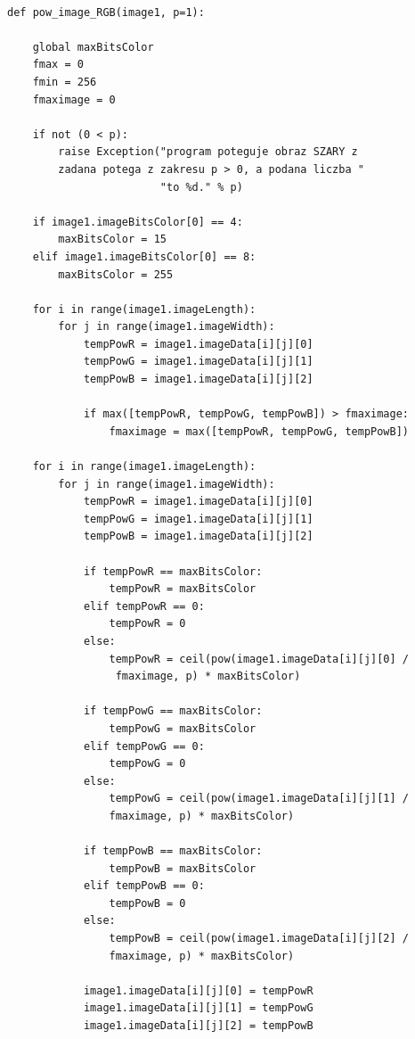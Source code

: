 \documentclass[magisterska,openany]{pracadypl}
\begin{document}
\lstset{language=Python}
\vspace{0.25cm}
\begin{lstlisting}[caption={Potęgowanie obrazu}]

def pow_image_RGB(image1, p=1):

    global maxBitsColor
    fmax = 0
    fmin = 256
    fmaximage = 0

    if not (0 < p):
        raise Exception("program poteguje obraz SZARY z 
        zadana potega z zakresu p > 0, a podana liczba "
                        "to %d." % p)

    if image1.imageBitsColor[0] == 4:
        maxBitsColor = 15
    elif image1.imageBitsColor[0] == 8:
        maxBitsColor = 255

    for i in range(image1.imageLength):
        for j in range(image1.imageWidth):
            tempPowR = image1.imageData[i][j][0]
            tempPowG = image1.imageData[i][j][1]
            tempPowB = image1.imageData[i][j][2]

            if max([tempPowR, tempPowG, tempPowB]) > fmaximage:
                fmaximage = max([tempPowR, tempPowG, tempPowB])

    for i in range(image1.imageLength):
        for j in range(image1.imageWidth):
            tempPowR = image1.imageData[i][j][0]
            tempPowG = image1.imageData[i][j][1]
            tempPowB = image1.imageData[i][j][2]

            if tempPowR == maxBitsColor:
                tempPowR = maxBitsColor
            elif tempPowR == 0:
                tempPowR = 0
            else:
                tempPowR = ceil(pow(image1.imageData[i][j][0] /
                 fmaximage, p) * maxBitsColor)

            if tempPowG == maxBitsColor:
                tempPowG = maxBitsColor
            elif tempPowG == 0:
                tempPowG = 0
            else:
                tempPowG = ceil(pow(image1.imageData[i][j][1] / 
                fmaximage, p) * maxBitsColor)

            if tempPowB == maxBitsColor:
                tempPowB = maxBitsColor
            elif tempPowB == 0:
                tempPowB = 0
            else:
                tempPowB = ceil(pow(image1.imageData[i][j][2] / 
                fmaximage, p) * maxBitsColor)

            image1.imageData[i][j][0] = tempPowR
            image1.imageData[i][j][1] = tempPowG
            image1.imageData[i][j][2] = tempPowB


\end{lstlisting}
\end{document}
